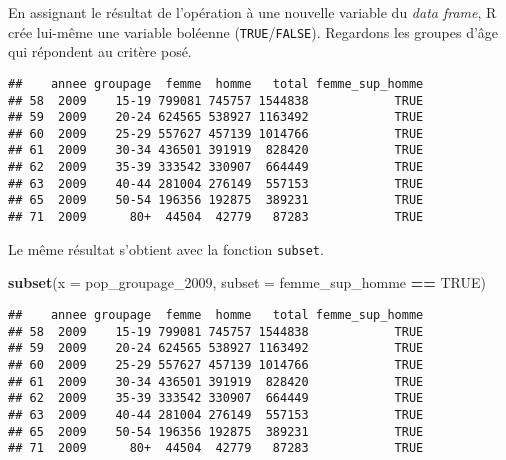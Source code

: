 \documentclass[]{book}
\newenvironment{Shaded}{\begin{snugshade}}{\end{snugshade}}
\newcommand{\KeywordTok}[1]{\textcolor[rgb]{0.13,0.29,0.53}{\textbf{#1}}}
\newcommand{\DataTypeTok}[1]{\textcolor[rgb]{0.13,0.29,0.53}{#1}}
\newcommand{\DecValTok}[1]{\textcolor[rgb]{0.00,0.00,0.81}{#1}}
\newcommand{\StringTok}[1]{\textcolor[rgb]{0.31,0.60,0.02}{#1}}
\newcommand{\OtherTok}[1]{\textcolor[rgb]{0.56,0.35,0.01}{#1}}
\newcommand{\OperatorTok}[1]{\textcolor[rgb]{0.81,0.36,0.00}{\textbf{#1}}}
\newcommand{\NormalTok}[1]{#1}
\begin{document}
En assignant le résultat de l'opération à une nouvelle variable du
\emph{data frame}, R crée lui-même une variable boléenne
(\texttt{TRUE}/\texttt{FALSE}). Regardons les groupes d'âge qui
répondent au critère posé.

\begin{Shaded}
\end{Shaded}

\begin{verbatim}
##    annee groupage  femme  homme   total femme_sup_homme
## 58  2009    15-19 799081 745757 1544838            TRUE
## 59  2009    20-24 624565 538927 1163492            TRUE
## 60  2009    25-29 557627 457139 1014766            TRUE
## 61  2009    30-34 436501 391919  828420            TRUE
## 62  2009    35-39 333542 330907  664449            TRUE
## 63  2009    40-44 281004 276149  557153            TRUE
## 65  2009    50-54 196356 192875  389231            TRUE
## 71  2009      80+  44504  42779   87283            TRUE
\end{verbatim}

Le même résultat s'obtient avec la fonction \texttt{subset}.

\begin{Shaded}
\begin{Highlighting}[]
\KeywordTok{subset}\NormalTok{(}\DataTypeTok{x =}\NormalTok{ pop_groupage_}\DecValTok{2009}\NormalTok{, }\DataTypeTok{subset =}\NormalTok{ femme_sup_homme }\OperatorTok{==}\StringTok{ }\OtherTok{TRUE}\NormalTok{)}
\end{Highlighting}
\end{Shaded}

\begin{verbatim}
##    annee groupage  femme  homme   total femme_sup_homme
## 58  2009    15-19 799081 745757 1544838            TRUE
## 59  2009    20-24 624565 538927 1163492            TRUE
## 60  2009    25-29 557627 457139 1014766            TRUE
## 61  2009    30-34 436501 391919  828420            TRUE
## 62  2009    35-39 333542 330907  664449            TRUE
## 63  2009    40-44 281004 276149  557153            TRUE
## 65  2009    50-54 196356 192875  389231            TRUE
## 71  2009      80+  44504  42779   87283            TRUE
\end{verbatim}
\end{document}
